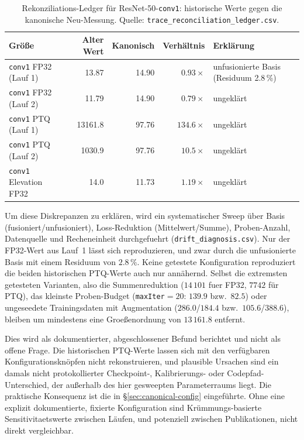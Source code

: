 \begin{table}[t]
\centering
\small
\caption{Rekonziliations-Ledger für ResNet-50-\texttt{conv1}: historische Werte gegen die kanonische Neu-Messung. Quelle: \texttt{trace\_reconciliation\_ledger.csv}.}
\label{tab:reconciliation}
\begin{tabularx}{\textwidth}{Xrrrl}
\toprule
Größe & Alter Wert & Kanonisch & Verhältnis & Erklärung \\
\midrule
\texttt{conv1} FP32 (Lauf 1) & 13.87 & 14.90 & $0.93\times$ & unfusionierte Basis (Residuum 2.8\,\%) \\
\texttt{conv1} FP32 (Lauf 2) & 11.79 & 14.90 & $0.79\times$ & ungeklärt \\
\texttt{conv1} PTQ (Lauf 1) & 13161.8 & 97.76 & $134.6\times$ & ungeklärt \\
\texttt{conv1} PTQ (Lauf 2) & 1030.9 & 97.76 & $10.5\times$ & ungeklärt \\
\texttt{conv1} Elevation FP32 & 14.0 & 11.73 & $1.19\times$ & ungeklärt \\
\bottomrule
\end{tabularx}
\end{table}

Um diese Diskrepanzen zu erklären, wird ein systematischer Sweep über Basis (fusioniert/unfusioniert), Loss-Reduktion (Mittelwert/Summe), Proben-Anzahl, Datenquelle und Recheneinheit durchgefuehrt (\texttt{drift\_diagnosis.csv}). Nur der FP32-Wert aus Lauf~1 lässt sich reproduzieren, und zwar durch die unfusionierte Basis mit einem Residuum von $2.8\,\%$. Keine getestete Konfiguration reproduziert die beiden historischen PTQ-Werte auch nur annähernd. Selbst die extremsten getesteten Varianten, also die Summenreduktion ($14\,101$ fuer FP32, $7742$ für PTQ), das kleinste Proben-Budget (\texttt{maxIter}$=20$: $139.9$ bzw.\ $82.5$) oder ungeseedete Trainingsdaten mit Augmentation ($286.0$/$184.4$ bzw.\ $105.6$/$388.6$), bleiben um mindestens eine Groeßenordnung von $13\,161.8$ entfernt.

Dies wird als dokumentierter, abgeschlossener Befund berichtet und nicht als offene Frage. Die historischen PTQ-Werte lassen sich mit den verfügbaren Konfigurationsknöpfen nicht rekonstruieren, und plausible Ursachen sind ein damals nicht protokollierter Checkpoint-, Kalibrierungs- oder Codepfad-Unterschied, der außerhalb des hier gesweepten Parameterraums liegt. Die praktische Konsequenz ist die in \S\ref{sec:canonical-config} eingeführte. Ohne eine explizit dokumentierte, fixierte Konfiguration sind Krümmungs-basierte Sensitivitaetswerte zwischen Läufen, und potenziell zwischen Publikationen, nicht direkt vergleichbar.


